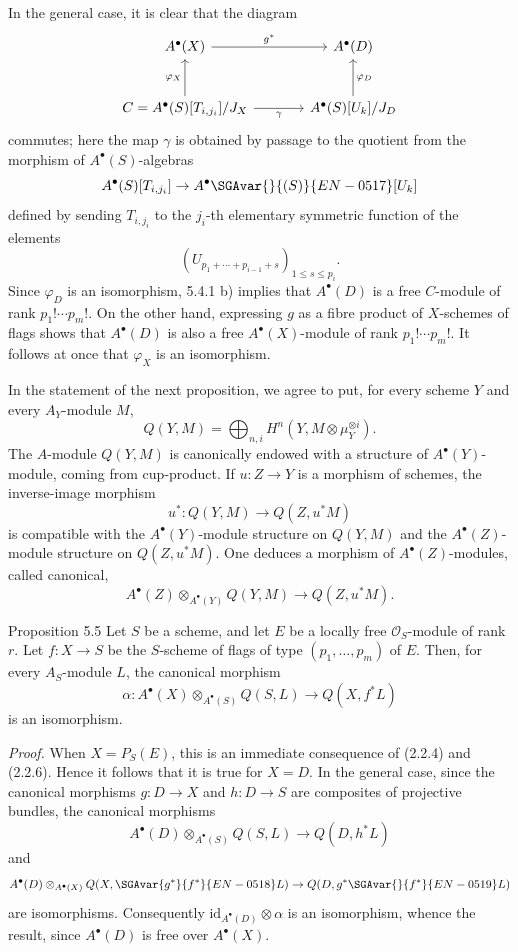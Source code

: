 In the general case, it is clear that the diagram
\[
\begin{tikzcd}[column sep=large,row sep=large]
A^{\bullet}(X) \arrow[r,"g^*"] & A^{\bullet}(D)\\
C=A^{\bullet}(S)[T_{i,j_i}]/J_X \arrow[u,"\varphi_X"] \arrow[r,"\gamma"'] &
A^{\bullet}(S)[U_k]/J_D \arrow[u,"\varphi_D"']
\end{tikzcd}
\]
commutes; here the map $\gamma$ is obtained by passage to the quotient from the morphism of $A^{\bullet}(S)$-algebras
\[
A^\bullet(S)[T_{i,j_i}]\to A^\bullet\SGAvar{}{(S)}{EN-0517}[U_k]
\]
defined by sending $T_{i,j_i}$ to the $j_i$-th elementary symmetric function of the elements
\[
(U_{p_1+\cdots+p_{i-1}+s})_{1\le s\le p_i}.
\]
Since $\varphi_D$ is an isomorphism, 5.4.1 b) implies that $A^{\bullet}(D)$ is a free $C$-module of rank $p_1!\cdots p_m!$. On the other hand, expressing $g$ as a fibre product of $X$-schemes of flags shows that $A^{\bullet}(D)$ is also a free $A^{\bullet}(X)$-module of rank $p_1!\cdots p_m!$. It follows at once that $\varphi_X$ is an isomorphism.

In the statement of the next proposition, we agree to put, for every scheme $Y$ and every $A_Y$-module $M$,
\[
Q(Y,M)=\bigoplus_{n,i}H^n(Y,M\otimes\mu_Y^{\otimes i}).
\]
The $A$-module $Q(Y,M)$ is canonically endowed with a structure of $A^\bullet(Y)$-module, coming from cup-product. If $u:Z\to Y$ is a morphism of schemes, the inverse-image morphism
\[
u^*:Q(Y,M)\to Q(Z,u^*M)
\]
is compatible with the $A^\bullet(Y)$-module structure on $Q(Y,M)$ and the $A^\bullet(Z)$-module structure on $Q(Z,u^*M)$. One deduces a morphism of $A^\bullet(Z)$-modules, called canonical,
\[
A^\bullet(Z)\otimes_{A^\bullet(Y)}Q(Y,M)\to Q(Z,u^*M).
\]

\begin{statement}{Proposition 5.5}
Let $S$ be a scheme, and let $E$ be a locally free $\mathcal O_S$-module of rank $r$. Let $f:X\to S$ be the $S$-scheme of flags of type $(p_1,\ldots,p_m)$ of $E$. Then, for every $A_S$-module $L$, the canonical morphism
\[
\alpha:A^\bullet(X)\otimes_{A^\bullet(S)}Q(S,L)\to Q(X,f^*L)
\]
is an isomorphism.
\end{statement}

\emph{Proof.} When $X=P_S(E)$, this is an immediate consequence of (2.2.4) and (2.2.6). Hence it follows that it is true for $X=D$. In the general case, since the canonical morphisms $g:D\to X$ and $h:D\to S$ are composites of projective bundles, the canonical morphisms
\[
A^\bullet(D)\otimes_{A^\bullet(S)}Q(S,L)\to Q(D,h^*L)
\]
and
\[
A^\bullet(D)\otimes_{A^\bullet(X)}Q(X,\SGAvar{g^*}{f^*}{EN-0518}L)\to Q(D,g^*\SGAvar{}{f^*}{EN-0519}L)
\]
are isomorphisms. Consequently $\mathrm{id}_{A^\bullet(D)}\otimes\alpha$ is an isomorphism, whence the result, since $A^\bullet(D)$ is free over $A^\bullet(X)$.

